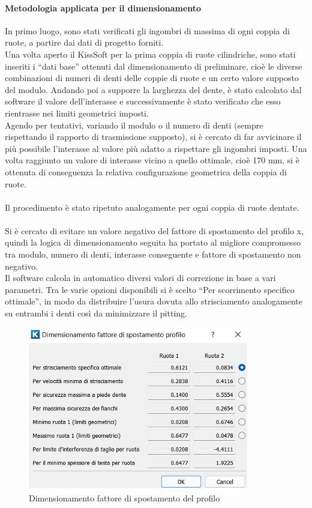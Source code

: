 \paragraph{Metodologia applicata per il dimensionamento}
In primo luogo, sono stati verificati gli ingombri di massima di ogni coppia di ruote, a partire dai dati di progetto forniti.\\
Una volta aperto il KissSoft per la prima coppia di ruote cilindriche, sono stati inseriti i “dati base” ottenuti dal dimensionamento di preliminare, cioè le diverse combinazioni di numeri di denti delle coppie di ruote e un certo valore supposto del modulo. Andando poi a supporre la larghezza del dente, è stato calcolato dal software il valore dell’interasse e successivamente è stato verificato che esso rientrasse nei limiti geometrici imposti. \\
Agendo per tentativi, variando il modulo o il numero di denti (sempre rispettando il rapporto di trasmissione supposto), si è cercato di far avvicinare il più possibile l’interasse al valore più adatto a rispettare gli ingombri imposti. Una volta raggiunto un valore di interasse vicino a quello ottimale, cioè 170 mm, si è ottenuta di conseguenza la relativa configurazione geometrica della coppia di ruote.\\
\\
Il procedimento è stato ripetuto analogamente per ogni coppia di ruote dentate.\\
\\
Si è cercato di evitare un valore negativo del fattore di spostamento del profilo x, quindi la logica di dimensionamento seguita ha portato al migliore compromesso tra modulo, numero di denti, interasse conseguente e fattore di spostamento non negativo. \\
Il software calcola in automatico diversi valori di correzione in base a vari parametri. Tra le varie opzioni disponibili si è scelto “Per scorrimento specifico ottimale”, in modo da distribuire l’usura dovuta allo strisciamento analogamente su entrambi i denti così da minimizzare il pitting.
\begin{figure}[h]
    \centering
    \includegraphics{Immagini/MetodologiaDimensionamentoCilindriche.png}
    \caption{Dimensionamento fattore di spostamento del profilo}
    \label{fig:MetodologiaDimensionamentoCilindriche}
\end{figure}
